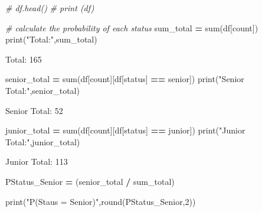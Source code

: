 \documentclass[
]{article}
\newenvironment{Shaded}{\begin{snugshade}}{\end{snugshade}}
\newcommand{\BuiltInTok}[1]{#1}
\newcommand{\CommentTok}[1]{\textcolor[rgb]{0.56,0.35,0.01}{\textit{#1}}}
\newcommand{\DecValTok}[1]{\textcolor[rgb]{0.00,0.00,0.81}{#1}}
\newcommand{\NormalTok}[1]{#1}
\newcommand{\OperatorTok}[1]{\textcolor[rgb]{0.81,0.36,0.00}{\textbf{#1}}}
\newcommand{\StringTok}[1]{\textcolor[rgb]{0.31,0.60,0.02}{#1}}
\begin{document}
\begin{Shaded}
\begin{Highlighting}[]
\CommentTok{\# df.head()}
\CommentTok{\# print (df)}

\CommentTok{\# calculate the probability of each status}
\NormalTok{sum\_total }\OperatorTok{=} \BuiltInTok{sum}\NormalTok{(df[}\StringTok{\textquotesingle{}count\textquotesingle{}}\NormalTok{])}
\BuiltInTok{print}\NormalTok{(}\StringTok{"Total:"}\NormalTok{,sum\_total)}
\end{Highlighting}
\end{Shaded}

Total: 165

\begin{Shaded}
\begin{Highlighting}[]
\NormalTok{senior\_total }\OperatorTok{=} \BuiltInTok{sum}\NormalTok{(df[}\StringTok{\textquotesingle{}count\textquotesingle{}}\NormalTok{][df[}\StringTok{\textquotesingle{}status\textquotesingle{}}\NormalTok{] }\OperatorTok{==} \StringTok{\textquotesingle{}senior\textquotesingle{}}\NormalTok{])}
\BuiltInTok{print}\NormalTok{(}\StringTok{"Senior Total:"}\NormalTok{,senior\_total)}
\end{Highlighting}
\end{Shaded}

Senior Total: 52

\begin{Shaded}
\begin{Highlighting}[]
\NormalTok{junior\_total }\OperatorTok{=} \BuiltInTok{sum}\NormalTok{(df[}\StringTok{\textquotesingle{}count\textquotesingle{}}\NormalTok{][df[}\StringTok{\textquotesingle{}status\textquotesingle{}}\NormalTok{] }\OperatorTok{==} \StringTok{\textquotesingle{}junior\textquotesingle{}}\NormalTok{])}
\BuiltInTok{print}\NormalTok{(}\StringTok{"Junior Total:"}\NormalTok{,junior\_total)}
\end{Highlighting}
\end{Shaded}

Junior Total: 113

\begin{Shaded}
\begin{Highlighting}[]
\NormalTok{PStatus\_Senior }\OperatorTok{=}\NormalTok{ (senior\_total }\OperatorTok{/}\NormalTok{ sum\_total)}

\BuiltInTok{print}\NormalTok{(}\StringTok{"P(Staus = Senior)"}\NormalTok{,}\BuiltInTok{round}\NormalTok{(PStatus\_Senior,}\DecValTok{2}\NormalTok{))}
\end{Highlighting}
\end{Shaded}
\end{document}
